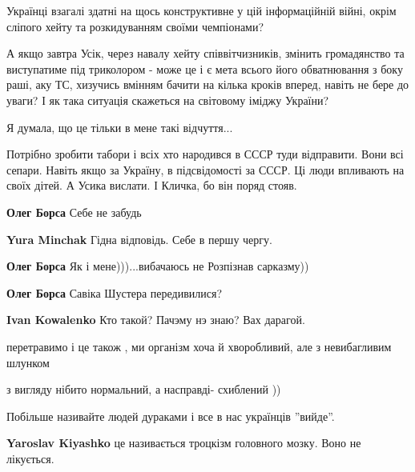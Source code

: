 \begin{itemize}
Українці взагалі здатні на щось конструктивне у цій інформаційній війні, окрім
сліпого хейту та розкидуванням своїми чемпіонами?

А якщо завтра Усік, через навалу хейту співвітчизників, змінить громадянство та
виступатиме під триколором - може це і є мета всього його обватнювання з боку
раші, аку ТС, хизучись вмінням бачити на кілька кроків вперед, навіть не бере
до уваги? І як така ситуація скажеться на світовому іміджу України?

Я думала, що це тільки в мене такі відчуття...


Потрібно зробити табори і всіх хто народився в СССР туди відправити. Вони всі
сепари. Навіть якщо за Україну, в підсвідомості за СССР. Ці люди впливають на
своїх дітей. А Усика вислати. І Кличка, бо він поряд стояв.

\begin{itemize} %
\textbf{Олег Борса} Себе не забудь

\textbf{Yura Minchak} Гідна відповідь. Себе в першу чергу.

\textbf{Олег Борса} Як і мене)))...вибачаюсь не
Розпізнав сарказму))

\textbf{Олег Борса} Савіка Шустера передивилися?

\textbf{Ivan Kowalenko} Кто такой? Пачэму нэ знаю? Вах дарагой.
\end{itemize} %

перетравимо і це також , ми організм хоча й хворобливий, але з невибагливим шлунком

з вигляду нібито нормальний, а насправді- схиблений ))

Побільше називайте людей дураками і все в нас українців ''вийде''.

\begin{itemize} %
\textbf{Yaroslav Kiyashko} це називається троцкізм головного мозку. Воно не лікується.
\end{itemize} %

\end{itemize} %
